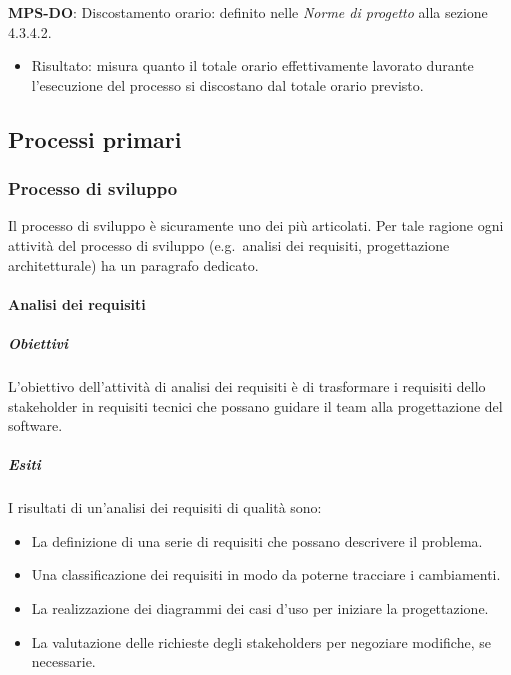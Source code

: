 \documentclass[../piano-di-qualifica.tex]{subfiles}
\begin{document}
\textbf{MPS-DO}: Discostamento orario: definito nelle \textit{Norme di progetto} alla sezione 4.3.4.2.
\begin{itemize}
  \item Risultato: misura quanto il totale orario effettivamente lavorato durante l’esecuzione
  del processo si discostano dal totale orario previsto.
\end{itemize}






\subsection{Processi primari}%
\label{sub:processi_primari}

\subsubsection{Processo di sviluppo}%
\label{subs:processo_di_sviluppo}
Il processo di sviluppo è sicuramente uno dei più articolati. Per tale ragione ogni attività del processo di sviluppo (e.g.\ analisi dei requisiti, progettazione architetturale) ha un paragrafo dedicato.

\paragraph{Analisi dei requisiti}%
\label{par:analisi_dei_requisiti}

\subparagraph{Obiettivi}%
\label{par:obiettivi}
L'obiettivo dell'attività di analisi dei requisiti è di trasformare i requisiti dello stakeholder in requisiti tecnici che possano guidare il team alla progettazione del software.

\subparagraph{Esiti}%
\label{par:esiti}
I risultati di un'analisi dei requisiti di qualità sono:
\begin{itemize}
  \item La definizione di una serie di requisiti che possano descrivere il problema.
  \item Una classificazione dei requisiti in modo da poterne tracciare i cambiamenti.
  \item La realizzazione dei diagrammi dei casi d'uso per iniziare la progettazione.
  \item La valutazione delle richieste degli stakeholders per negoziare modifiche, se necessarie.
\end{itemize}
\end{document}
